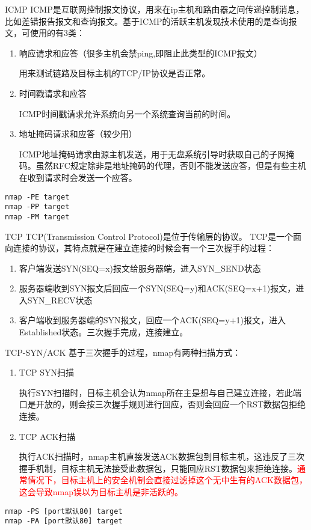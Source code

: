 \documentclass{beamer}
\begin{document}
\begin{frame}[fragile]{ICMP}
ICMP是互联网控制报文协议，用来在ip主机和路由器之间传递控制消息，比如差错报告报文和查询报文。基于ICMP的活跃主机发现技术使用的是查询报文，可使用的有3类：
\begin{enumerate}
\item 响应请求和应答（很多主机会禁ping,即阻止此类型的ICMP报文）

用来测试链路及目标主机的TCP/IP协议是否正常。
\item 时间戳请求和应答

ICMP时间戳请求允许系统向另一个系统查询当前的时间。
\item 地址掩码请求和应答（较少用）

ICMP地址掩码请求由源主机发送，用于无盘系统引导时获取自己的子网掩码。虽然RFC规定除非是地址掩码的代理，否则不能发送应答，但是有些主机在收到请求时会发送一个应答。
\end{enumerate}
\begin{example}[命令语法]
\begin{verbatim}
nmap -PE target
nmap -PP target
nmap -PM target
\end{verbatim}
\end{example}
\end{frame}
\begin{frame}[fragile]{TCP}
TCP(Transmission Control Protocol)是位于传输层的协议。
TCP是一个面向连接的协议，其特点就是在建立连接的时候会有一个三次握手的过程：
\begin{enumerate}
\item 客户端发送SYN(SEQ=x)报文给服务器端，进入SYN\_SEND状态
\item 服务器端收到SYN报文后回应一个SYN(SEQ=y)和ACK(SEQ=x+1)报文，进入SYN\_RECV状态
\item 客户端收到服务器端的SYN报文，回应一个ACK(SEQ=y+1)报文，进入Established状态。三次握手完成，连接建立。
\end{enumerate}

\end{frame}
\begin{frame}[fragile]{TCP-SYN/ACK}
基于三次握手的过程，nmap有两种扫描方式：
\begin{enumerate}
\item TCP SYN扫描

执行SYN扫描时，目标主机会认为nmap所在主是想与自己建立连接，若此端口是开放的，则会按三次握手规则进行回应，否则会回应一个RST数据包拒绝连接。
\item TCP ACK扫描

执行ACK扫描时，nmap主机直接发送ACK数据包到目标主机，这违反了三次握手机制，目标主机无法接受此数据包，只能回应RST数据包来拒绝连接。\textcolor{red}{通常情况下，目标主机上的安全机制会直接过滤掉这个无中生有的ACK数据包，这会导致nmap误以为目标主机是非活跃的。}
\end{enumerate}
\begin{example}[命令语法]
\begin{verbatim}
nmap -PS [port默认80] target
nmap -PA [port默认80] target
\end{verbatim}
\end{example}
\end{frame}
\end{document}
